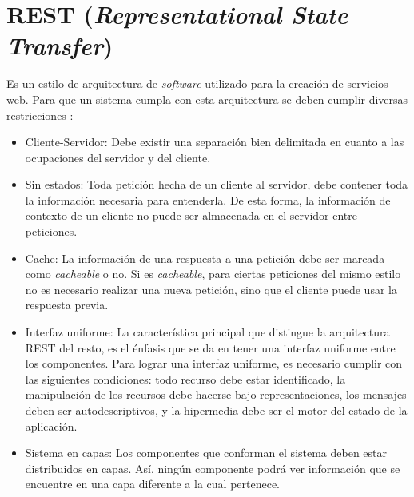 \section{REST (\textit{Representational State Transfer})}\label{REST}

Es un estilo de arquitectura de \textit{software} utilizado para la creación de servicios web. Para que un sistema cumpla con esta arquitectura se deben cumplir diversas restricciones \cite{REST0}:

\begin{itemize}
	\item Cliente-Servidor: Debe existir una separación bien delimitada en cuanto a las ocupaciones del servidor y del cliente.
	\item Sin estados: Toda petición hecha de un cliente al servidor, debe contener toda la información necesaria para entenderla. De esta forma, la información de contexto de un cliente no puede ser almacenada en el servidor entre peticiones. 
	\item Cache: La información de una respuesta a una petición debe ser marcada como \textit{cacheable} o no. Si es \textit{cacheable}, para ciertas peticiones del mismo estilo no es necesario realizar una nueva petición, sino que el cliente puede usar la respuesta previa.
	\item Interfaz uniforme: La característica principal que distingue la arquitectura REST del resto, es el énfasis que se da en tener una interfaz uniforme entre los componentes. Para lograr una interfaz uniforme, es necesario cumplir con las siguientes condiciones: todo recurso debe estar identificado, la manipulación de los recursos debe hacerse bajo representaciones, los mensajes deben ser autodescriptivos, y la hipermedia debe ser el motor del estado de la aplicación.
	\item Sistema en capas: Los componentes que conforman el sistema deben estar distribuidos en capas. Así, ningún componente podrá ver información que se encuentre en una capa diferente a la cual pertenece.
\end{itemize}